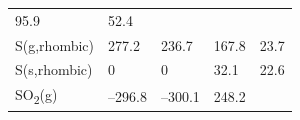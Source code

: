 \documentclass[
  9pt,
]{extbook}
\theoremstyle{definition}
\theoremstyle{definition}
\theoremstyle{definition}
\theoremstyle{remark}
\begin{document}
\begin{longtable}[]{@{}lllll@{}}
\begin{minipage}[t]{0.18\columnwidth}
95.9\strut
\end{minipage} & \begin{minipage}[t]{0.18\columnwidth}\raggedright
52.4\strut
\end{minipage}\tabularnewline
\begin{minipage}[t]{0.10\columnwidth}\raggedright
S(g,rhombic)\strut
\end{minipage} & \begin{minipage}[t]{0.19\columnwidth}\raggedright
277.2\strut
\end{minipage} & \begin{minipage}[t]{0.20\columnwidth}\raggedright
236.7\strut
\end{minipage} & \begin{minipage}[t]{0.18\columnwidth}\raggedright
167.8\strut
\end{minipage} & \begin{minipage}[t]{0.18\columnwidth}\raggedright
23.7\strut
\end{minipage}\tabularnewline
\begin{minipage}[t]{0.10\columnwidth}\raggedright
S(s,rhombic)\strut
\end{minipage} & \begin{minipage}[t]{0.19\columnwidth}\raggedright
0\strut
\end{minipage} & \begin{minipage}[t]{0.20\columnwidth}\raggedright
0\strut
\end{minipage} & \begin{minipage}[t]{0.18\columnwidth}\raggedright
32.1\strut
\end{minipage} & \begin{minipage}[t]{0.18\columnwidth}\raggedright
22.6\strut
\end{minipage}\tabularnewline
\begin{minipage}[t]{0.10\columnwidth}\raggedright
SO\textsubscript{2}(g)\strut
\end{minipage} & \begin{minipage}[t]{0.19\columnwidth}\raggedright
--296.8\strut
\end{minipage} & \begin{minipage}[t]{0.20\columnwidth}\raggedright
--300.1\strut
\end{minipage} & \begin{minipage}[t]{0.18\columnwidth}\raggedright
248.2\strut
\end{minipage} & \begin{minipage}[t]{0.18\columnwidth}\raggedright

\end{minipage}
\end{longtable}
\end{document}
